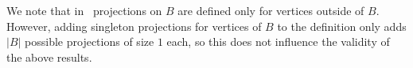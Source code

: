 We note that in~\cite{drange2016kernelization,eickmeyer2016neighborhood} projections on $B$ are defined only for vertices outside of $B$. 
However, adding singleton projections for vertices of $B$ to the definition only adds $|B|$ possible projections of size $1$ each, so this does not influence the validity of the above results.

